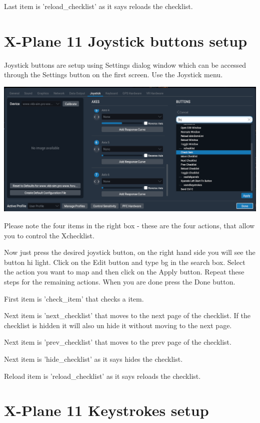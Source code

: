 \documentclass[11pt,parskip=half,a4paper]{scrartcl}
\begin{document}
Last item is 'reload\_checklist' as it says reloads the checklist.

\newpage
\section{X-Plane 11 Joystick buttons setup}

Joystick buttons are setup using Settings dialog window which can be accessed through the Settings button on the first screen. Use the Joystick menu.

\begin{center}
\includegraphics[width=17cm]{XP11_JoystickButtonsSetup.png}
\end{center}

Please note the four items in the right box - these are the four actions, that allow you to control the 
Xchecklist. 

Now just press the desired joystick button, on the right hand side you will see the button hi light. Click on the Edit button and type bg in the search box. Select the action you want to map and then click on the Apply button. Repeat these steps for the remaining actions. When you are done press the Done button.

First item is 'check\_item' that checks a item. 

Next item is 'next\_checklist' that moves to the next page of the checklist. If the checklist is hidden it 
will also un hide it without moving to the next page. 

Next item is 'prev\_checklist' that moves to the prev page of the checklist.

Next item is 'hide\_checklist' as it says hides the checklist.

Reload item is 'reload\_checklist' as it says reloads the checklist.


\newpage
\section{X-Plane 11 Keystrokes setup}
\end{document}
